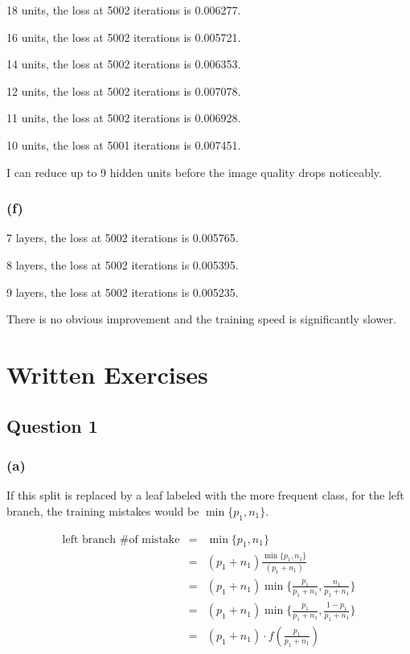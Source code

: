 \documentclass[12pt]{article}
\begin{document}
{18 units, the loss at 5002 iterations is 0.006277.

16 units, the loss at 5002 iterations is 0.005721.

14 units, the loss at 5002 iterations is 0.006353.

12 units, the loss at 5002 iterations is 0.007078.

11 units, the loss at 5002 iterations is 0.006928.

10 units, the loss at 5001 iterations is 0.007451.

\medskip
I can reduce up to 9 hidden units before the image quality drops noticeably.

\subsubsection*{(f)}
7 layers, the loss at 5002 iterations is 0.005765.

8 layers, the loss at 5002 iterations is 0.005395.

9 layers, the loss at 5002 iterations is 0.005235.

\medskip
There is no obvious improvement and the training speed is significantly slower.

\section*{Written Exercises}
\subsection*{Question 1}
\subsubsection*{(a)}
If this split is replaced by a leaf labeled with the more frequent class, for the left branch, the training mistakes would be $\min \lbrace p_{1}, n_{1} \rbrace $. 

\begin{eqnarray*}
\text{left branch \# of mistake} &=& \min \lbrace p_{1}, n_{1} \rbrace \\
&=& (p_{1} + n_{1}) \frac{\min \lbrace p_{1}, n_{1} \rbrace}{(p_{1} + n_{1})} \\
&=& (p_{1} + n_{1}) \min\{\frac{p_1}{p_1+n_1},\frac{n_1}{p_1+n_1}\} \\
&=& (p_{1} + n_{1}) \min\{\frac{p_1}{p_1+n_1},\frac{1-p_1}{p_1+n_1}\} \\
&=& (p_{1} + n_{1})\cdot f(\frac{p_{1}}{p_{1}+n_{1}})
\end{eqnarray*}

}
\end{document}

